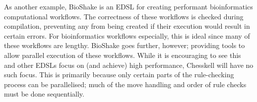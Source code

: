 \documentclass[12pt, a4paper, bibliography=totocnumbered]{scrartcl}
\begin{document}
As another example, BioShake \cite{bioshake} is an EDSL for creating performant bioinformatics computational workflows. The correctness of these workflows is checked during compilation, preventing any from being created if their execution would result in certain errors. For bioinformatics workflows especially, this is ideal since many of these workflows are lengthy. BioShake goes further, however; providing tools to allow parallel execution of these workflows. While it is encouraging to see this and other EDSLs \cite{aplite} focus on (and achieve) high performance, Chesskell will have no such focus. This is primarily because only certain parts of the rule-checking process can be parallelised; much of the move handling and order of rule checks must be done sequentially.


\end{document}
